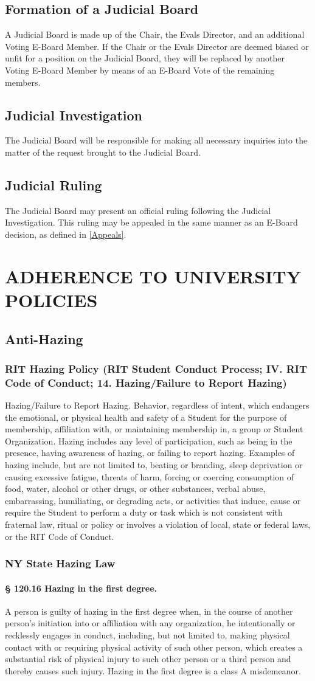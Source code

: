 \documentclass{article}
\newcommand{\article}[1]{\section{#1} \label{#1}}
\newcommand{\asection}[1]{\subsection{#1} \label{#1}}
\newcommand{\asubsection}[1]{\subsubsection{#1} \label{#1}}
\newcommand{\asubsubsection}[1]{\paragraph{#1} \label{#1}}
\begin{document}
\asection{Formation of a Judicial Board}
A Judicial Board is made up of the Chair, the Evals Director, and an additional Voting E-Board Member.
If the Chair or the Evals Director are deemed biased or unfit for a position on the Judicial Board, they will be replaced by another Voting E-Board Member by means of an E-Board Vote of the remaining members.

\asection{Judicial Investigation}
The Judicial Board will be responsible for making all necessary inquiries into the matter of the request brought to the Judicial Board.

\asection{Judicial Ruling}
The Judicial Board may present an official ruling following the Judicial Investigation.
This ruling may be appealed in the same manner as an E-Board decision, as defined in \ref{Appeals}.

\article{ADHERENCE TO UNIVERSITY POLICIES}

\asection{Anti-Hazing}

\asubsection{RIT Hazing Policy (RIT Student Conduct Process; IV. RIT Code of Conduct; 14. Hazing/Failure to Report Hazing)}
Hazing/Failure to Report Hazing.
Behavior, regardless of intent, which endangers the emotional, or physical health and safety of a Student for the purpose of membership, affiliation with, or maintaining membership in, a group or Student Organization.
Hazing includes any level of participation, such as being in the presence, having awareness of hazing, or failing to report hazing.
Examples of hazing include, but are not limited to, beating or branding, sleep deprivation or causing excessive fatigue, threats of harm, forcing or coercing consumption of food, water, alcohol or other drugs, or other substances, verbal abuse, embarrassing, humiliating, or degrading acts, or activities that induce, cause or require the Student to perform a duty or task which is not consistent with fraternal law, ritual or policy or involves a violation of local, state or federal laws, or the RIT Code of Conduct.

\asubsection{NY State Hazing Law}

\asubsubsection{§ 120.16 Hazing in the first degree.}
A person is guilty of hazing in the first degree when, in the course of another person's initiation into or affiliation with any organization, he intentionally or recklessly engages in conduct, including, but not limited to, making physical contact with or requiring physical activity of such other person, which creates a substantial risk of physical injury to such other person or a third person and thereby causes such injury.
Hazing in the first degree is a class A misdemeanor.
\end{document}
